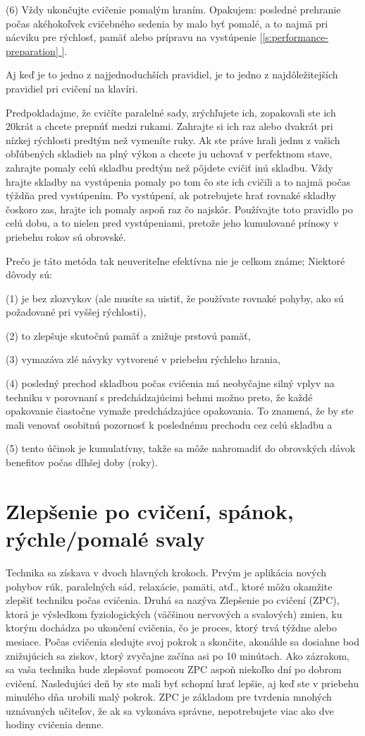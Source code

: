 \documentclass[11pt,a4paper]{book}
\newcommand*{\fullref}[1]{\hyperref[{#1}]{\ref*{#1} \nameref*{#1}}} %
\newcommand*{\fullrefp}[1]{[\fullref{#1}]} %
\begin{document}
(6) Vždy ukončujte cvičenie pomalým hraním. Opakujem: posledné prehranie počas akéhokoľvek cvičebného sedenia by malo byť pomalé, a to najmä pri nácviku pre rýchlosť, pamäť alebo prípravu na vystúpenie \fullrefp{s:performance-preparation}.

Aj keď je to jedno z najjednoduchších pravidiel, je to jedno z najdôležitejších pravidiel pri cvičení na klavíri.

Predpokladajme, že cvičíte paralelné sady, zrýchľujete ich, zopakovali ste ich 20krát a chcete prepnúť medzi rukami. Zahrajte si ich raz alebo dvakrát pri nízkej rýchlosti predtým než vymeníte ruky. Ak ste práve hrali jednu z vašich obľúbených skladieb na plný výkon a chcete ju uchovať v perfektnom stave, zahrajte pomaly celú skladbu predtým než pôjdete cvičiť inú skladbu. Vždy hrajte skladby na vystúpenia pomaly po tom čo ste ich cvičili a to najmä počas týždňa pred vystúpením. Po vystúpení, ak potrebujete hrať rovnaké skladby čoskoro zas, hrajte ich pomaly aspoň raz čo najskôr. Používajte toto pravidlo po celú dobu, a to nielen pred vystúpeniami, pretože jeho kumulované prínosy v priebehu rokov sú obrovské.

Prečo je táto metóda tak neuveriteľne efektívna nie je celkom známe; Niektoré dôvody sú:

(1) je bez zlozvykov (ale musíte sa uistiť, že používate rovnaké pohyby, ako sú požadované pri vyššej rýchlosti),

(2) to zlepšuje skutočnú pamäť a znižuje prstovú pamäť,

(3) vymazáva zlé návyky vytvorené v priebehu rýchleho hrania,

(4) posledný prechod skladbou počas cvičenia má neobyčajne silný vplyv na techniku v porovnaní s predchádzajúcimi behmi možno preto, že každé opakovanie čiastočne vymaže predchádzajúce opakovania. To znamená, že by ste mali venovať osobitnú pozornosť k poslednému prechodu cez celú skladbu a

(5) tento účinok je kumulatívny, takže sa môže nahromadiť do obrovských dávok benefitov počas dlhšej doby (roky).

\section{Zlepšenie po cvičení, spánok, rýchle/pomalé svaly}\label{s:post-improvement}
Technika sa získava v dvoch hlavných krokoch. Prvým je aplikácia nových pohybov rúk, paralelných sád, relaxácie, pamäti, atď., ktoré môžu okamžite zlepšiť techniku počas cvičenia. Druhá sa nazýva Zlepšenie po cvičení (ZPC), ktorá je výsledkom fyziologických (väčšinou nervových a svalových) zmien, ku ktorým dochádza po ukončení cvičenia, čo je proces, ktorý trvá týždne alebo mesiace. Počas cvičenia sledujte svoj pokrok a skončite, akonáhle sa dosiahne bod znižujúcich sa ziskov, ktorý zvyčajne začína asi po 10 minútach. Ako zázrakom, sa vaša technika bude zlepšovať pomocou ZPC aspoň niekoľko dní po dobrom cvičení. Nasledujúci deň by ste mali byť schopní hrať lepšie, aj keď ste v priebehu minulého dňa urobili malý pokrok. ZPC je základom pre tvrdenia mnohých uznávaných učiteľov, že ak sa vykonáva správne, nepotrebujete viac ako dve hodiny cvičenia denne.
\end{document}
